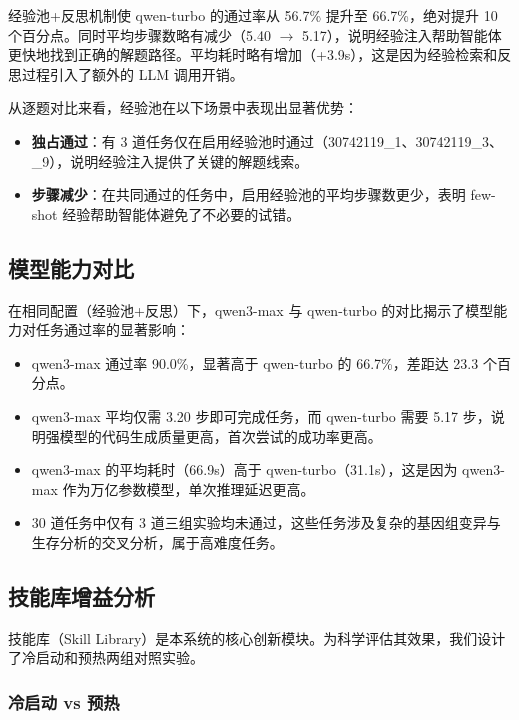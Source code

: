 经验池+反思机制使 qwen-turbo 的通过率从 56.7\% 提升至 66.7\%，绝对提升 10 个百分点。同时平均步骤数略有减少（5.40 $\rightarrow$ 5.17），说明经验注入帮助智能体更快地找到正确的解题路径。平均耗时略有增加（+3.9s），这是因为经验检索和反思过程引入了额外的 LLM 调用开销。

从逐题对比来看，经验池在以下场景中表现出显著优势：
\begin{itemize}
    \item \textbf{独占通过}：有 3 道任务仅在启用经验池时通过（30742119\_1、30742119\_3、\_9），说明经验注入提供了关键的解题线索。
    \item \textbf{步骤减少}：在共同通过的任务中，启用经验池的平均步骤数更少，表明 few-shot 经验帮助智能体避免了不必要的试错。
\end{itemize}

\subsection{模型能力对比}

在相同配置（经验池+反思）下，qwen3-max 与 qwen-turbo 的对比揭示了模型能力对任务通过率的显著影响：

\begin{itemize}
    \item qwen3-max 通过率 90.0\%，显著高于 qwen-turbo 的 66.7\%，差距达 23.3 个百分点。
    \item qwen3-max 平均仅需 3.20 步即可完成任务，而 qwen-turbo 需要 5.17 步，说明强模型的代码生成质量更高，首次尝试的成功率更高。
    \item qwen3-max 的平均耗时（66.9s）高于 qwen-turbo（31.1s），这是因为 qwen3-max 作为万亿参数模型，单次推理延迟更高。
    \item 30 道任务中仅有 3 道三组实验均未通过，这些任务涉及复杂的基因组变异与生存分析的交叉分析，属于高难度任务。
\end{itemize}

\subsection{技能库增益分析}

技能库（Skill Library）是本系统的核心创新模块。为科学评估其效果，我们设计了冷启动和预热两组对照实验。

\subsubsection{冷启动 vs 预热}


